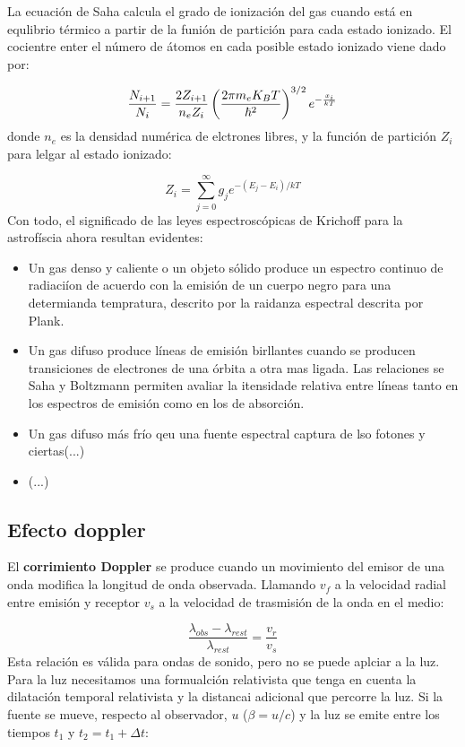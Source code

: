 La ecuación de Saha calcula el grado de ionización del gas cuando está en equlibrio térmico a partir de la funión de partición para cada estado ionizado. El cocientre enter el número de átomos en cada posible estado ionizado viene dado por:

\begin{equation}
    \frac{N_{i+1}}{N_i} = \frac{2Z_{i+1}}{n_eZ_i} \left( \frac{2\pi m_eK_B T}{\hbar^2} \right)^{3/2} e^{-\frac{x_i}{kT}}
\end{equation}
donde $n_e$ es la densidad numérica de elctrones libres, y la función de partición $Z_i$ para lelgar al estado ionizado:

\begin{equation}
    Z_i = \sum_{j=0}^\infty g_j e^{-(E_j-E_i)/kT}
\end{equation}
Con todo, el significado de las leyes espectroscópicas de Krichoff para la astrofíscia ahora resultan evidentes:

\begin{itemize}
    \item Un gas denso y caliente o un objeto sólido produce un espectro continuo de radiaciíon de acuerdo con la emisión de un cuerpo negro para una determianda tempratura, descrito por la raidanza espectral descrita por Plank.
    \item Un gas difuso produce líneas de emisión birllantes cuando se producen transiciones de electrones de una órbita a otra mas ligada. Las relaciones se Saha y Boltzmann permiten avaliar la itensidade relativa entre líneas tanto en los espectros de emisión como en los de absorción.
    \item Un gas difuso más frío qeu una fuente espectral captura de lso fotones y ciertas(...)
    \item (...)
\end{itemize}

\subsection{Efecto doppler}

El \textbf{corrimiento Doppler} se produce cuando un movimiento del emisor de una onda modifica la longitud de onda observada. Llamando $v_f$ a la velocidad radial entre emisión y receptor $v_s$ a la velocidad de trasmisión de la onda en el medio:

\begin{equation}
    \frac{\lambda_{obs}-\lambda_{rest}}{\lambda_{rest}} = \frac{v_r}{v_s}
\end{equation}
Esta relación es válida para ondas de sonido, pero no se puede aplciar a la luz. Para la luz necesitamos una formualción relativista que tenga en cuenta la dilatación temporal relativista y la distancai adicional que percorre la luz. Si la fuente se mueve, respecto al observador, $u$ ($\beta=u/c$) y la luz se emite entre los tiempos $t_1$ y $t_2=t_1+\Delta t$:

